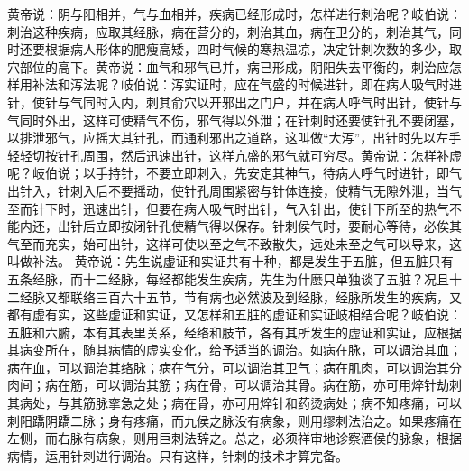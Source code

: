 \documentclass[a4paper,12pt,UTF8,twoside]{ctexbook}
\begin{document}
黄帝说：阴与阳相并，气与血相并，疾病已经形成时，怎样进行刺治呢？岐伯说：刺治这种疾病，应取其经脉，病在营分的，刺治其血，病在卫分的，刺治其气，同时还要根据病人形体的肥瘦高矮，四时气候的寒热温凉，决定针刺次数的多少，取穴部位的高下。黄帝说：血气和邪气已并，病已形成，阴阳失去平衡的，刺治应怎样用补法和泻法呢？岐伯说：泻实证时，应在气盛的时候进针，即在病人吸气时进针，使针与气同时入内，刺其俞穴以开邪出之门户，并在病人呼气时出针，使针与气同时外出，这样可使精气不伤，邪气得以外泄；在针刺时还要使针孔不要闭塞，以排泄邪气，应摇大其针孔，而通利邪出之道路，这叫做“大泻”，出针时先以左手轻轻切按针孔周围，然后迅速出针，这样亢盛的邪气就可穷尽。黄帝说：怎样补虚呢？岐伯说；以手持针，不要立即刺入，先安定其神气，待病人呼气时进针，即气出针入，针刺入后不要摇动，使针孔周围紧密与针体连接，使精气无隙外泄，当气至而针下时，迅速出针，但要在病人吸气时出针，气入针出，使针下所至的热气不能内还，出针后立即按闭针孔使精气得以保存。针刺侯气时，要耐心等待，必俟其气至而充实，始可出针，这样可使以至之气不致散失，远处未至之气可以导来，这叫做补法。
黄帝说：先生说虚证和实证共有十种，都是发生于五脏，但五脏只有五条经脉，而十二经脉，每经都能发生疾病，先生为什麽只单独谈了五脏？况且十二经脉又都联络三百六十五节，节有病也必然波及到经脉，经脉所发生的疾病，又都有虚有实，这些虚证和实证，又怎样和五脏的虚证和实证岐相结合呢？岐伯说：五脏和六腑，本有其表里关系，经络和肢节，各有其所发生的虚证和实证，应根据其病变所在，随其病情的虚实变化，给予适当的调治。如病在脉，可以调治其血；病在血，可以调治其络脉；病在气分，可以调治其卫气；病在肌肉，可以调治其分肉间；病在筋，可以调治其筋；病在骨，可以调治其骨。病在筋，亦可用焠针劫刺其病处，与其筋脉挛急之处；病在骨，亦可用焠针和药烫病处；病不知疼痛，可以刺阳蹻阴蹻二脉；身有疼痛，而九侯之脉没有病象，则用缪刺法治之。如果疼痛在左侧，而右脉有病象，则用巨刺法辞之。总之，必须祥审地诊察酒侯的脉象，根据病情，运用针刺进行调治。只有这样，针刺的技术才算完备。

\part{}
\end{document}
